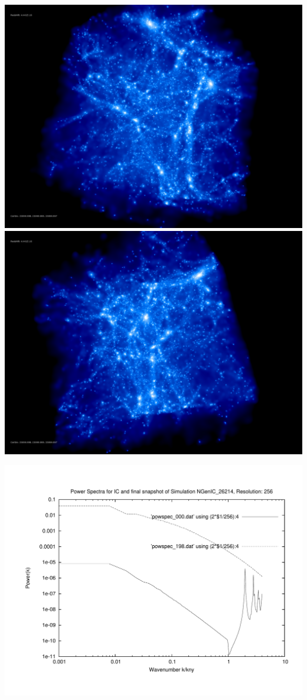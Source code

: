 \includegraphics[scale=0.1]{r256/NGenIC_26214/rotate_00074.jpg} 
\includegraphics[scale=0.1]{r256/NGenIC_26214/rotate_00131.jpg}

\includegraphics[scale=0.5]{r256/NGenIC_26214/plot_powspec_NGenIC_26214}

